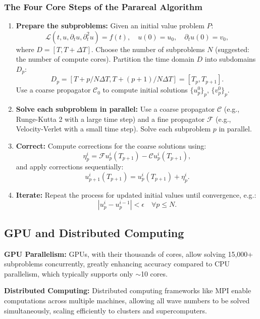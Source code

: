 \subsubsection*{The Four Core Steps of the Parareal Algorithm}
\begin{enumerate}
    \item \textbf{Prepare the subproblems:}
    Given an initial value problem $P$:
    \[
    \mathcal{L}(t, u, \partial_t u, \partial_t^2 u) = f(t), \quad u(0) = u_0, \quad \partial_t u(0) = v_0,
    \]
    where $D = [T, T + \Delta T]$. Choose the number of subproblems $N$ (suggested: the number of compute cores). Partition the time domain $D$ into subdomains $D_p$:
    \[
    D_p = [T + p / N \Delta T, T + (p + 1) / N \Delta T] = [T_p, T_{p+1}].
    \]
    Use a coarse propagator $\mathcal{C}_0$ to compute initial solutions $\{u_p^0\}_p$, $\{v_p^0\}_p$.

    \item \textbf{Solve each subproblem in parallel:}
    Use a coarse propagator $\mathcal{C}$ (e.g., Runge-Kutta 2 with a large time step) and a fine propagator $\mathcal{F}$ (e.g., Velocity-Verlet with a small time step). Solve each subproblem $p$ in parallel.

    \item \textbf{Correct:}
    Compute corrections for the coarse solutions using:
    \[
    \eta_p^i = \mathcal{F} u_p^i (T_{p+1}) - \mathcal{C} u_p^i (T_{p+1}),
    \]
    and apply corrections sequentially:
    \[
    u_{p+1}^i(T_{p+1}) = u_p^i(T_{p+1}) + \eta_p^i.
    \]

    \item \textbf{Iterate:}
    Repeat the process for updated initial values until convergence, e.g.:
    \[
    |u_p^i - u_p^{i-1}| < \epsilon \quad \forall p \leq N.
    \]
\end{enumerate}

\subsection*{GPU and Distributed Computing}
\textbf{GPU Parallelism:} GPUs, with their thousands of cores, allow solving 15,000+ subproblems concurrently, greatly enhancing accuracy compared to CPU parallelism, which typically supports only $\sim$10 cores.

\textbf{Distributed Computing:} Distributed computing frameworks like MPI enable computations across multiple machines, allowing all wave numbers to be solved simultaneously, scaling efficiently to clusters and supercomputers.

